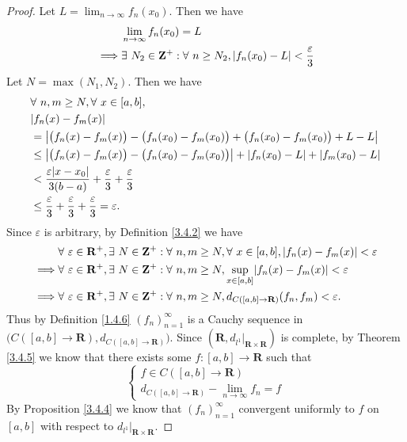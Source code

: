 \begin{proof}
    Let \(L = \lim_{n \to \infty} f_n(x_0)\).
    Then we have
    \begin{align*}
                 & \lim_{n \to \infty} f_n(x_0) = L                                                                 \\
        \implies & \exists\ N_2 \in \mathbf{Z}^+ : \forall\ n \geq N_2, \abs*{f_n(x_0) - L} < \frac{\varepsilon}{3}
    \end{align*}
    Let \(N = \max(N_1, N_2)\).
    Then we have
    \begin{align*}
         & \forall\ n, m \geq N, \forall\ x \in [a, b],                                                                      \\
         & \abs*{f_n(x) - f_m(x)}                                                                                            \\
         & = \abs*{\big(f_n(x) - f_m(x)\big) - \big(f_n(x_0) - f_m(x_0)\big) + \big(f_n(x_0) - f_m(x_0)\big) + L - L}        \\
         & \leq \abs*{\big(f_n(x) - f_m(x)\big) - \big(f_n(x_0) - f_m(x_0)\big)} + \abs*{f_n(x_0) - L} + \abs*{f_m(x_0) - L} \\
         & < \frac{\varepsilon \abs*{x - x_0}}{3(b - a)} + \frac{\varepsilon}{3} + \frac{\varepsilon}{3}                     \\
         & \leq \frac{\varepsilon}{3} + \frac{\varepsilon}{3} + \frac{\varepsilon}{3} = \varepsilon.
    \end{align*}
    Since \(\varepsilon\) is arbitrary, by Definition \ref{3.4.2} we have
    \begin{align*}
                 & \forall\ \varepsilon \in \mathbf{R}^+, \exists\ N \in \mathbf{Z}^+ : \forall\ n, m \geq N, \forall\ x \in [a, b], \abs*{f_n(x) - f_m(x)} < \varepsilon \\
        \implies & \forall\ \varepsilon \in \mathbf{R}^+, \exists\ N \in \mathbf{Z}^+ : \forall\ n, m \geq N, \sup_{x \in [a, b]}\abs*{f_n(x) - f_m(x)} < \varepsilon     \\
        \implies & \forall\ \varepsilon \in \mathbf{R}^+, \exists\ N \in \mathbf{Z}^+ : \forall\ n, m \geq N, d_{C([a, b] \to \mathbf{R})}(f_n, f_m) < \varepsilon.
    \end{align*}
    Thus by Definition \ref{1.4.6} \((f_n)_{n = 1}^\infty\) is a Cauchy sequence in \(\big(C([a, b] \to \mathbf{R}), d_{C([a, b] \to \mathbf{R})}\big)\).
    Since \((\mathbf{R}, d_{l^1}|_{\mathbf{R} \times \mathbf{R}})\) is complete, by Theorem \ref{3.4.5} we know that there exists some \(f : [a, b] \to \mathbf{R}\) such that
    \[
        \begin{cases}
            f \in C([a, b] \to \mathbf{R}) \\
            d_{C([a, b] \to \mathbf{R})} - \lim_{n \to \infty} f_n = f
        \end{cases}
    \]
    By Proposition \ref{3.4.4} we know that \((f_n)_{n = 1}^\infty\) convergent uniformly to \(f\) on \([a, b]\) with respect to \(d_{l^1}|_{\mathbf{R} \times \mathbf{R}}\).


\end{proof}
